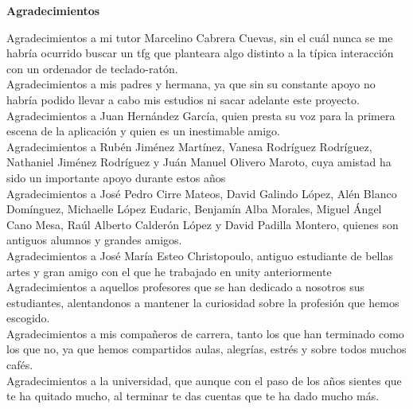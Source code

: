 \thispagestyle{empty}

\begin{flushleft}
	\textbf{\LARGE Agradecimientos}\\
\end{flushleft}

\vspace{1cm}

\begin{flushleft}
	Agradecimientos a mi tutor Marcelino Cabrera Cuevas, sin el cuál nunca se me habría ocurrido buscar un tfg que planteara algo distinto a la típica interacción con un ordenador de teclado-ratón.\\
	Agradecimientos a mis padres y hermana, ya que sin su constante apoyo no habría podido llevar a cabo mis estudios ni sacar adelante este proyecto.\\
	Agradecimientos a Juan Hernández García, quien presta su voz para la primera escena de la aplicación y quien es un inestimable amigo.\\
	Agradecimientos a Rubén Jiménez Martínez, Vanesa Rodríguez Rodríguez, Nathaniel Jiménez Rodríguez y Juán Manuel Olivero Maroto, cuya amistad ha sido un importante apoyo durante estos años\\
	Agradecimientos a José Pedro Cirre Mateos, David Galindo López, Alén Blanco Domínguez, Michaelle López Eudaric, Benjamín Alba Morales, Miguel Ángel Cano Mesa, Raúl Alberto Calderón López y David Padilla Montero,  quienes son antiguos alumnos y grandes amigos.\\
	Agradecimientos a José María Esteo Christopoulo, antiguo estudiante de bellas artes y gran amigo con el que he trabajado en unity anteriormente\\
	Agradecimientos a aquellos profesores que se han dedicado a nosotros sus estudiantes, alentandonos a mantener la curiosidad sobre la profesión que hemos escogido.\\
	Agradecimientos a mis compañeros de carrera, tanto los que han terminado como los que no, ya que hemos compartidos aulas, alegrías, estrés y sobre todos muchos cafés.\\
	Agradecimientos a la universidad, que aunque con el paso de los años sientes que te ha quitado mucho, al terminar te das cuentas que te ha dado mucho más.\\
\end{flushleft}

\newpage %
